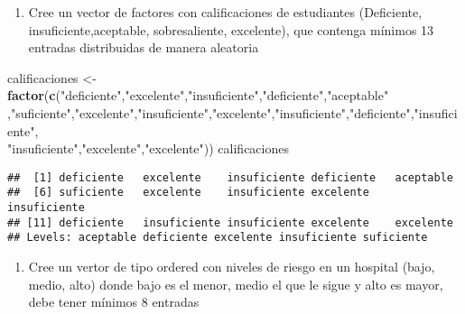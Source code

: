 \documentclass[]{article}
\newenvironment{Shaded}{\begin{snugshade}}{\end{snugshade}}
\newcommand{\KeywordTok}[1]{\textcolor[rgb]{0.13,0.29,0.53}{\textbf{#1}}}
\newcommand{\StringTok}[1]{\textcolor[rgb]{0.31,0.60,0.02}{#1}}
\newcommand{\NormalTok}[1]{#1}
\providecommand{\tightlist}{%
  \setlength{\itemsep}{0pt}\setlength{\parskip}{0pt}}
\begin{document}
\begin{enumerate}
\def\labelenumi{\alph{enumi}.}
\setcounter{enumi}{5}
\tightlist
\item
  Cree un vector de factores con calificaciones de estudiantes
  (Deficiente, insuficiente,aceptable, sobresaliente, excelente), que
  contenga mínimos 13 entradas distribuidas de manera aleatoria
\end{enumerate}

\begin{Shaded}
\begin{Highlighting}[]
\NormalTok{calificaciones <-}\StringTok{ }\KeywordTok{factor}\NormalTok{(}\KeywordTok{c}\NormalTok{(}\StringTok{"deficiente"}\NormalTok{,}\StringTok{"excelente"}\NormalTok{,}\StringTok{"insuficiente"}\NormalTok{,}\StringTok{"deficiente"}\NormalTok{,}\StringTok{"aceptable"}\\
\NormalTok{,}\StringTok{"suficiente"}\NormalTok{,}\StringTok{"excelente"}\NormalTok{,}\StringTok{"insuficiente"}\NormalTok{,}\StringTok{"excelente"}\NormalTok{,}\StringTok{"insuficiente"}\NormalTok{,}\StringTok{"deficiente"}\NormalTok{,}\StringTok{"insuficiente"}\NormalTok{,}\\
\StringTok{"insuficiente"}\NormalTok{,}\StringTok{"excelente"}\NormalTok{,}\StringTok{"excelente"}\NormalTok{))}
\NormalTok{calificaciones}
\end{Highlighting}
\end{Shaded}

\begin{verbatim}
##  [1] deficiente   excelente    insuficiente deficiente   aceptable   
##  [6] suficiente   excelente    insuficiente excelente    insuficiente
## [11] deficiente   insuficiente insuficiente excelente    excelente   
## Levels: aceptable deficiente excelente insuficiente suficiente
\end{verbatim}

\begin{enumerate}
\def\labelenumi{\alph{enumi}.}
\setcounter{enumi}{6}
\tightlist
\item
  Cree un vertor de tipo ordered con niveles de riesgo en un hospital
  (bajo, medio, alto) donde bajo es el menor, medio el que le sigue y
  alto es mayor, debe tener mínimos 8 entradas
\end{enumerate}
\end{document}
